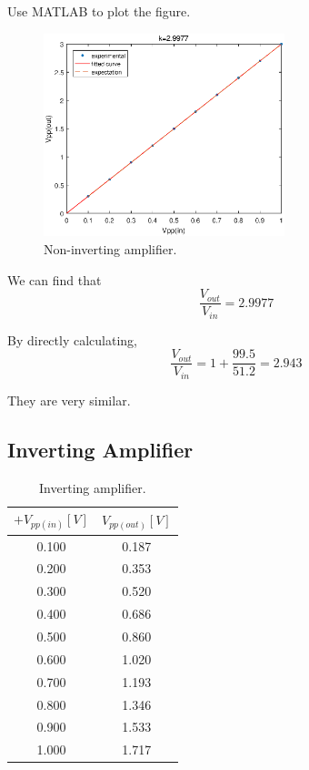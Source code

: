 \documentclass{article}
\begin{document}
Use MATLAB to plot the figure.
\begin{figure}[h!]
    \centering
    \includegraphics[width=7cm]{1.eps}
    \caption{Non-inverting amplifier.}
    \label{fig-1}
\end{figure}

We can find that 
$$\frac{V_{out}}{V_{in}}=2.9977$$

By directly calculating,
$$\frac{V_{out}}{V_{in}}=1+\frac{99.5}{51.2}=2.943$$

They are very similar.

\subsection{Inverting Amplifier}


\begin{table}[!h]
\begin{center}
\begin{tabular}{|c|c|}
\hline
$+V_{pp(in)}[V]$ & $V_{pp(out)}[V]$ \\
\hline
0.100	&	0.187\\
\hline
0.200	&	0.353\\
\hline
0.300	&	0.520\\
\hline
0.400	&	0.686\\
\hline
0.500	&	0.860\\
\hline
0.600	&	1.020\\
\hline
0.700	&	1.193\\
\hline
0.800	&	1.346\\
\hline
0.900	&	1.533\\
\hline
1.000	&	1.717\\
\hline
\end{tabular}
\caption{Inverting amplifier.}
\label{tab-3}
\end{center}
\end{table}
\end{document}
